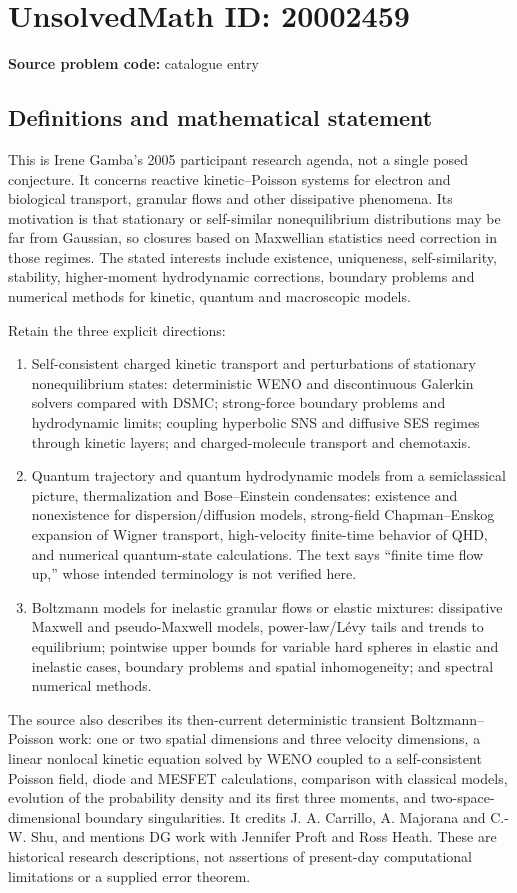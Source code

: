 \documentclass[11pt]{article}
\begin{document}
\section*{UnsolvedMath ID: 20002459}
\textbf{Source problem code:} catalogue entry
\subsection{Definitions and mathematical statement}
This is Irene Gamba's 2005 participant research agenda, not a single posed conjecture. It concerns reactive kinetic--Poisson systems for electron and biological transport, granular flows and other dissipative phenomena. Its motivation is that stationary or self-similar nonequilibrium distributions may be far from Gaussian, so closures based on Maxwellian statistics need correction in those regimes. The stated interests include existence, uniqueness, self-similarity, stability, higher-moment hydrodynamic corrections, boundary problems and numerical methods for kinetic, quantum and macroscopic models.

Retain the three explicit directions:
\begin{enumerate}
\item Self-consistent charged kinetic transport and perturbations of stationary nonequilibrium states: deterministic WENO and discontinuous Galerkin solvers compared with DSMC; strong-force boundary problems and hydrodynamic limits; coupling hyperbolic SNS and diffusive SES regimes through kinetic layers; and charged-molecule transport and chemotaxis.
\item Quantum trajectory and quantum hydrodynamic models from a semiclassical picture, thermalization and Bose--Einstein condensates: existence and nonexistence for dispersion/diffusion models, strong-field Chapman--Enskog expansion of Wigner transport, high-velocity finite-time behavior of QHD, and numerical quantum-state calculations. The text says ``finite time flow up,'' whose intended terminology is not verified here.
\item Boltzmann models for inelastic granular flows or elastic mixtures: dissipative Maxwell and pseudo-Maxwell models, power-law/L\'evy tails and trends to equilibrium; pointwise upper bounds for variable hard spheres in elastic and inelastic cases, boundary problems and spatial inhomogeneity; and spectral numerical methods.
\end{enumerate}
The source also describes its then-current deterministic transient Boltzmann--Poisson work: one or two spatial dimensions and three velocity dimensions, a linear nonlocal kinetic equation solved by WENO coupled to a self-consistent Poisson field, diode and MESFET calculations, comparison with classical models, evolution of the probability density and its first three moments, and two-space-dimensional boundary singularities. It credits J. A. Carrillo, A. Majorana and C.-W. Shu, and mentions DG work with Jennifer Proft and Ross Heath. These are historical research descriptions, not assertions of present-day computational limitations or a supplied error theorem.
\end{document}

